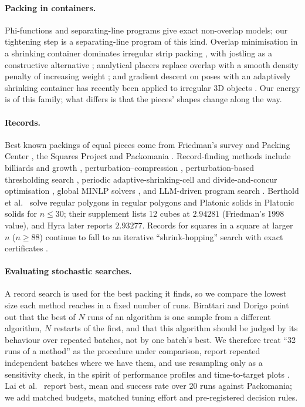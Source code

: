 \paragraph{Packing in containers.} Phi-functions \cite{Bennell2010,Romanova2018} and separating-line programs \cite{Peralta2018} give exact non-overlap models; our tightening step is a separating-line program of this kind. Overlap minimisation in a shrinking container dominates irregular strip packing \cite{Umetani2009,Imamichi2009,Egeblad2007,Gardeyn2025}, with jostling as a constructive alternative \cite{Dowsland1998}; analytical placers replace overlap with a smooth density penalty of increasing weight \cite{Lu2015}; and gradient descent on poses with an adaptively shrinking container has recently been applied to irregular 3D objects \cite{Gupta2026}. Our energy is of this family; what differs is that the pieces' shapes change along the way.

\paragraph{Records.} Best known packings of equal pieces come from Friedman's survey and Packing Center \cite{friedmansurvey,friedmancenter}, the Squares Project \cite{squaresproject} and Packomania \cite{packomania}. Record-finding methods include billiards and growth \cite{lubachevsky,LubachevskyGraham1997}, perturbation--compression \cite{Gensane2004,gensane}, perturbation-based thresholding search \cite{Lai2023}, periodic adaptive-shrinking-cell and divide-and-concur optimisation \cite{TorquatoJiao2009,Kallus2010}, global MINLP solvers \cite{Berthold2026}, and LLM-driven program search \cite{Novikov2025,Georgiev2025,hyra}. Berthold et al.\ \cite{Berthold2026} solve regular polygons in regular polygons and Platonic solids in Platonic solids for $n\le30$; their supplement lists 12 cubes at $2.94281$ (Friedman's 1998 value), and Hyra \cite{hyra} later reports $2.93277$. Records for squares in a square at larger $n$ ($n\ge88$) continue to fall to an iterative ``shrink-hopping'' search with exact certificates \cite{squish}.

\paragraph{Evaluating stochastic searches.} A record search is used for the best packing it finds, so we compare the lowest size each method reaches in a fixed number of runs. Birattari and Dorigo \cite{Birattari2005} point out that the best of $N$ runs of an algorithm is one sample from a different algorithm, $N$ restarts of the first, and that this algorithm should be judged by its behaviour over repeated batches, not by one batch's best. We therefore treat ``32 runs of a method'' as the procedure under comparison, report repeated independent batches where we have them, and use resampling only as a sensitivity check, in the spirit of performance profiles and time-to-target plots \cite{Dolan2002,Aiex2007,Hansen2021}. Lai et al.\ \cite{Lai2023} report best, mean and success rate over 20 runs against Packomania; we add matched budgets, matched tuning effort and pre-registered decision rules.
